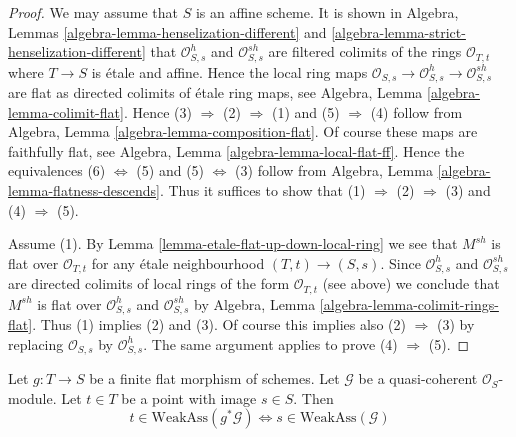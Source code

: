 \begin{proof}
We may assume that $S$ is an affine scheme. It is shown in
Algebra, Lemmas \ref{algebra-lemma-henselization-different}
and \ref{algebra-lemma-strict-henselization-different}
that $\mathcal{O}_{S, s}^h$ and $\mathcal{O}_{S, s}^{sh}$
are filtered colimits of the rings $\mathcal{O}_{T, t}$ where
$T \to S$ is \'etale and affine. Hence the local ring maps
$\mathcal{O}_{S, s} \to \mathcal{O}_{S, s}^h \to \mathcal{O}_{S, s}^{sh}$
are flat as directed colimits of \'etale ring maps, see
Algebra, Lemma \ref{algebra-lemma-colimit-flat}.
Hence (3) $\Rightarrow$ (2) $\Rightarrow$ (1) and
(5) $\Rightarrow$ (4) follow from
Algebra, Lemma \ref{algebra-lemma-composition-flat}.
Of course these maps are faithfully flat, see
Algebra, Lemma \ref{algebra-lemma-local-flat-ff}.
Hence the equivalences (6) $\Leftrightarrow$ (5) and
(5) $\Leftrightarrow$ (3) follow from
Algebra, Lemma \ref{algebra-lemma-flatness-descends}.
Thus it suffices to show that
(1) $\Rightarrow$ (2) $\Rightarrow$ (3) and
(4) $\Rightarrow$ (5).

\medskip\noindent
Assume (1). By
Lemma \ref{lemma-etale-flat-up-down-local-ring}
we see that $M^{sh}$ is flat over $\mathcal{O}_{T, t}$ for
any \'etale neighbourhood $(T, t) \to (S, s)$. Since $\mathcal{O}_{S, s}^h$
and $\mathcal{O}_{S, s}^{sh}$ are directed colimits of local rings
of the form $\mathcal{O}_{T, t}$ (see above)
we conclude that $M^{sh}$ is flat over $\mathcal{O}_{S, s}^h$
and $\mathcal{O}_{S, s}^{sh}$ by
Algebra, Lemma \ref{algebra-lemma-colimit-rings-flat}.
Thus (1) implies (2) and (3). Of course this implies also
(2) $\Rightarrow$ (3) by replacing $\mathcal{O}_{S, s}$ by
$\mathcal{O}_{S, s}^h$. The same argument applies to prove
(4) $\Rightarrow$ (5).
\end{proof}

\begin{lemma}
\label{lemma-finite-flat-weak-assassin-up-down}
Let $g : T \to S$ be a finite flat morphism of schemes.
Let $\mathcal{G}$ be a quasi-coherent $\mathcal{O}_S$-module.
Let $t \in T$ be a point with image $s \in S$. Then
$$
t \in \text{WeakAss}(g^*\mathcal{G})
\Leftrightarrow
s \in \text{WeakAss}(\mathcal{G})
$$
\end{lemma}

